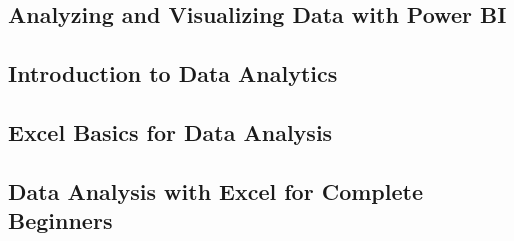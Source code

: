 \hypertarget{analyzing-and-visualizing-data-with-power-bi}{%
\subsection{Analyzing and Visualizing Data with Power BI}\label{analyzing-and-visualizing-data-with-power-bi}}

\hypertarget{introduction-to-data-analytics}{%
\subsection{Introduction to Data Analytics}\label{introduction-to-data-analytics}}

\hypertarget{excel-basics-for-data-analysis}{%
\subsection{Excel Basics for Data Analysis}\label{excel-basics-for-data-analysis}}

\hypertarget{data-analysis-with-excel-for-complete-beginners}{%
\subsection{Data Analysis with Excel for Complete Beginners}\label{data-analysis-with-excel-for-complete-beginners}}
